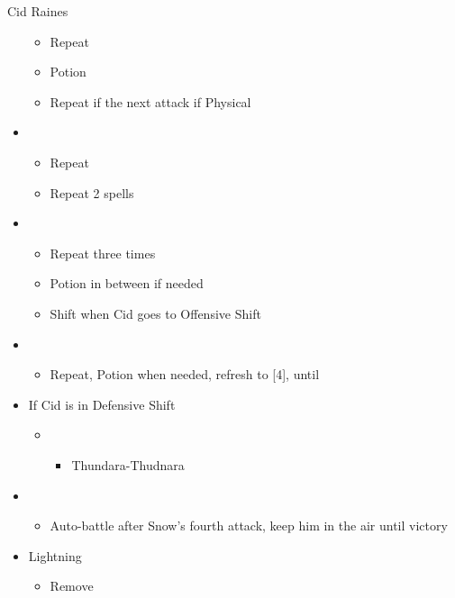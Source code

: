 \begin{paracol}{2}
\begin{battle}{Cid Raines}
\begin{itemize}
    \begin{itemize}
        \item Repeat
        \item Potion
        \item Repeat if the next attack if Physical
    \end{itemize}
    \item \fifth
    \begin{itemize}
        \item Repeat
        \item Repeat 2 spells
    \end{itemize}
    \item \second
    \begin{itemize}
        \item Repeat three times
        \item Potion in between if needed
        \item Shift when Cid goes to Offensive Shift
    \end{itemize}
    \item \third
    \begin{itemize}
        \item Repeat, Potion when needed, refresh to [4], until \stagger
    \end{itemize}
    \item If Cid is in Defensive Shift
    \begin{itemize}
        \item \second
        \begin{itemize}
            \item Thundara-Thudnara
        \end{itemize}
    \end{itemize}
    \item \sixth
    \begin{itemize}
        \item Auto-battle after Snow's fourth attack, keep him in the air until victory
    \end{itemize}
\end{itemize}
\end{battle}
\switchcolumn*
	\begin{menu}
		\begin{itemize}
			\equip
			\begin{itemize}
				\item Lightning
				      \begin{itemize}
					      \item Remove

\end{itemize}
\end{itemize}
\end{itemize}
\end{menu}
\end{paracol}
